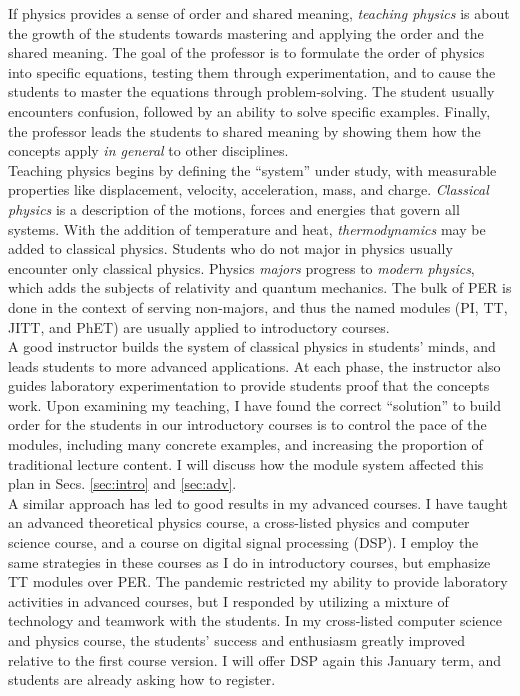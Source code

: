 \documentclass[../../../main.tex]{subfiles}
\begin{document}
If physics provides a sense of order and shared meaning, \textit{teaching physics} is about the growth of the students towards mastering and applying the order and the shared meaning.  The goal of the professor is to formulate the order of physics into specific equations, testing them through experimentation, and to cause the students to master the equations through problem-solving.  The student usually encounters confusion, followed by an ability to solve specific examples.  Finally, the professor leads the students to shared meaning by showing them how the concepts apply \textit{in general} to other disciplines.
\\
\vspace{0.15cm}
Teaching physics begins by defining the ``system'' under study, with measurable properties like displacement, velocity, acceleration, mass, and charge.  \textit{Classical physics} is a description of the motions, forces and energies that govern all systems.  With the addition of temperature and heat, \textit{thermodynamics} may be added to classical physics.  Students who do not major in physics usually encounter only classical physics.  Physics \textit{majors} progress to \textit{modern physics}, which adds the subjects of relativity and quantum mechanics.  The bulk of PER is done in the context of serving non-majors, and thus the named modules (PI, TT, JITT, and PhET) are usually applied to introductory courses.
\\
\vspace{0.15cm}
A good instructor builds the system of classical physics in students' minds, and leads students to more advanced applications.  At each phase, the instructor also guides laboratory experimentation to provide students proof that the concepts work.  Upon examining my teaching, I have found the correct ``solution'' to build order for the students in our introductory courses is to control the pace of the modules, including many concrete examples, and increasing the proportion of traditional lecture content.  I will discuss how the module system affected this plan in Secs. \ref{sec:intro} and \ref{sec:adv}.
\\
\vspace{0.15cm}
A similar approach has led to good results in my advanced courses.  I have taught an advanced theoretical physics course, a cross-listed physics and computer science course, and a course on digital signal processing (DSP).  I employ the same strategies in these courses as I do in introductory courses, but emphasize TT modules over PER.  The pandemic restricted my ability to provide laboratory activities in advanced courses, but I responded by utilizing a mixture of technology and teamwork with the students.  In my cross-listed computer science and physics course, the students' success and enthusiasm greatly improved relative to the first course version.  I will offer DSP again this January term, and students are already asking how to register.
\end{document}
